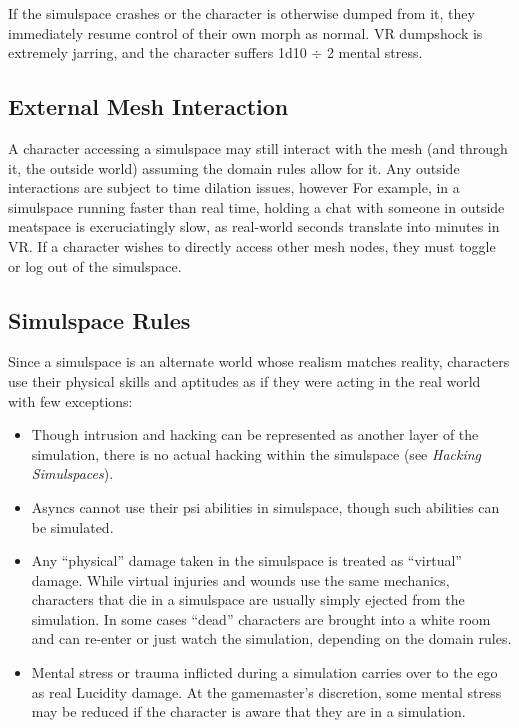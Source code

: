 If the simulspace crashes or the character is otherwise dumped from it, they immediately resume control of their own morph as normal. VR dumpshock is extremely jarring, and the character suffers 1d10 $\div$ 2 mental stress. 



\subsection{External Mesh Interaction} 

A character accessing a simulspace may still interact with the mesh (and through it, the outside world) assuming the domain rules allow for it. Any outside interactions are subject to time dilation issues, however For example, in a simulspace running faster than real time, holding a chat with someone in outside meatspace is excruciatingly slow, as real-world seconds translate into minutes in VR. If a character wishes to directly access other mesh nodes, they must toggle or log out of the simulspace. 

\subsection{Simulspace Rules} 

Since a simulspace is an alternate world whose realism matches reality, characters use their physical skills and aptitudes as if they were acting in the real world with few exceptions: \begin{itemize} \item Though intrusion and hacking can be represented as another layer of the simulation, there is no actual hacking within the simulspace (see \textit{Hacking Simulspaces}). 

\item Asyncs cannot use their psi abilities in simulspace, though such abilities can be simulated. 

\item Any ``physical'' damage taken in the simulspace is treated as ``virtual'' damage. While virtual injuries and wounds use the same mechanics, characters that die in a simulspace are usually simply ejected from the simulation. In some cases ``dead'' characters are brought into a white room and can re-enter or just watch the simulation, depending on the domain rules. 

\item Mental stress or trauma inflicted during a simulation carries over to the ego as real Lucidity damage. At the gamemaster's discretion, some mental stress may be reduced if the character is aware that they are in a simulation. \end{itemize} 



